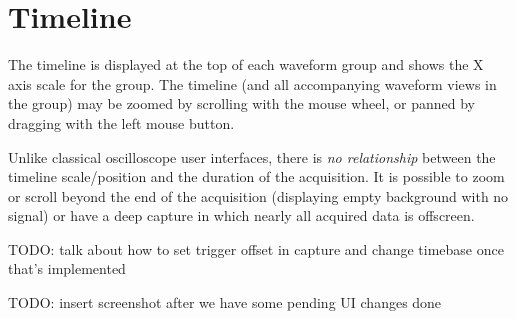 
\section{Timeline}

The timeline is displayed at the top of each waveform group and shows the X axis scale for the group. The timeline (and
all accompanying waveform views in the group) may be zoomed by scrolling with the mouse wheel, or panned by dragging
with the left mouse button.

Unlike classical oscilloscope user interfaces, there is \emph{no relationship} between the timeline scale/position and
the duration of the acquisition. It is possible to zoom or scroll beyond the end of the acquisition (displaying empty
background with no signal) or have a deep capture in which nearly all acquired data is offscreen.

TODO: talk about how to set trigger offset in capture and change timebase once that's implemented

TODO: insert screenshot after we have some pending UI changes done
